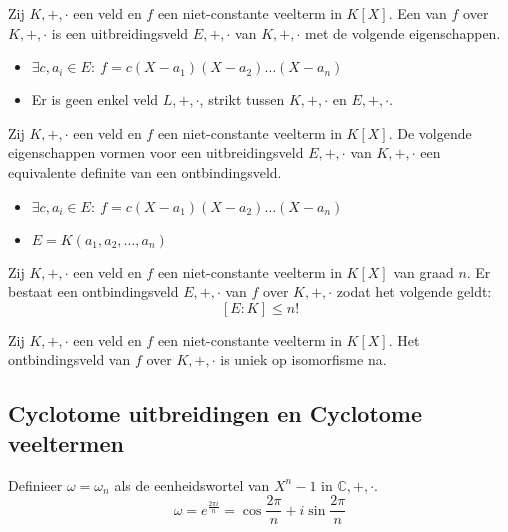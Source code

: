 \documentclass[main.tex]{subfiles}
\begin{document}
\begin{de}
  Zij $K,+,\cdot$ een veld en $f$ een niet-constante veelterm in $K[X]$.
  Een  van $f$ over $K,+,\cdot$ is een uitbreidingsveld $E,+,\cdot$ van $K,+,\cdot$ met de volgende eigenschappen.
  \begin{itemize}
  \item $\exists c, a_{i} \in E:\ f = c(X-a_{1})(X-a_{2})\dotsc(X-a_{n})$
  \item Er is geen enkel veld $L,+,\cdot$, strikt tussen $K,+,\cdot$ en $E,+,\cdot$.
  \end{itemize}
\end{de}

\begin{st}
  Zij $K,+,\cdot$ een veld en $f$ een niet-constante veelterm in $K[X]$.
  De volgende eigenschappen vormen voor een uitbreidingsveld $E,+,\cdot$ van $K,+,\cdot$ een equivalente definite van een ontbindingsveld.
  \begin{itemize}
  \item $\exists c, a_{i} \in E:\ f = c(X-a_{1})(X-a_{2})\dotsc(X-a_{n})$
  \item $E = K(a_{1},a_{2},\dotsc,a_{n})$
  \end{itemize} 
\end{st}

\begin{st}
  Zij $K,+,\cdot$ een veld en $f$ een niet-constante veelterm in $K[X]$ van graad $n$.
  Er bestaat een ontbindingsveld $E,+,\cdot$ van $f$ over $K,+,\cdot$ zodat het volgende geldt:
  \[ [E:K] \le n! \]
\end{st}

\begin{st}
  Zij $K,+,\cdot$ een veld en $f$ een niet-constante veelterm in $K[X]$.
  Het ontbindingsveld van $f$ over $K,+,\cdot$ is uniek op isomorfisme na.
  \zb
\end{st}

\subsection{Cyclotome uitbreidingen en Cyclotome veeltermen}
\label{sec:cycl-uitbr-en}

\begin{de}
  Definieer $\omega=\omega_{n}$ als de eenheidswortel van $X^{n}-1$ in $\mathbb{C},+,\cdot$.
  \[ \omega = e^{\frac{2\pi i}{n}} = \cos\frac{2\pi}{n} + i\sin\frac{2\pi}{n} \]
\end{de}
\end{document}
